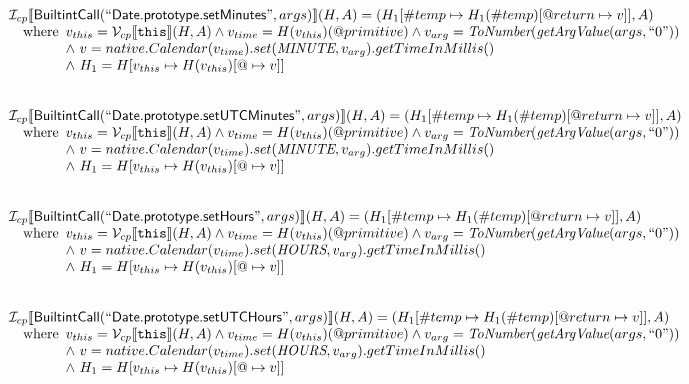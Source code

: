 \[\begin{array}{l}
\mathcal{I} _{cp}\llbracket \mbox{\textsf{BuiltintCall}}(``\mbox{\textsf{Date.prototype.setMinutes}}",args)\rrbracket(H,A)
  = (H_1[\#temp \mapsto H_1(\#temp)[@return \mapsto v]], A)\\
\quad{\rm where}\begin{array}[t]{l}
  v_{this} = \mathcal{V} _{cp}\llbracket \mbox{\texttt{this}}\rrbracket (H,A) \land v_{time} = H(v_{this})(@primitive)
  \land v_{arg} = \emph{ToNumber}(\emph{getArgValue}(args, ``0"))\\
  \land\ v = native.Calendar(v_{time}).set(\emph{MINUTE}, v_{arg}).getTimeInMillis()\\
  \land\ H_1 = H[v_{this} \mapsto H(v_{this})[@\mapsto v]]
  \end{array}\\
\\\\


\mathcal{I} _{cp}\llbracket \mbox{\textsf{BuiltintCall}}(``\mbox{\textsf{Date.prototype.setUTCMinutes}}",args)\rrbracket(H,A)
  = (H_1[\#temp \mapsto H_1(\#temp)[@return \mapsto v]], A)\\
\quad{\rm where}\begin{array}[t]{l}
  v_{this} = \mathcal{V} _{cp}\llbracket \mbox{\texttt{this}}\rrbracket (H,A) \land v_{time} = H(v_{this})(@primitive)
  \land v_{arg} = \emph{ToNumber}(\emph{getArgValue}(args, ``0"))\\
  \land\ v = native.Calendar(v_{time}).set(\emph{MINUTE}, v_{arg}).getTimeInMillis()\\
  \land\ H_1 = H[v_{this} \mapsto H(v_{this})[@\mapsto v]]
  \end{array}\\
\\\\


\mathcal{I} _{cp}\llbracket \mbox{\textsf{BuiltintCall}}(``\mbox{\textsf{Date.prototype.setHours}}",args)\rrbracket(H,A)
  = (H_1[\#temp \mapsto H_1(\#temp)[@return \mapsto v]], A)\\
\quad{\rm where}\begin{array}[t]{l}
  v_{this} = \mathcal{V} _{cp}\llbracket \mbox{\texttt{this}}\rrbracket (H,A) \land v_{time} = H(v_{this})(@primitive)
  \land v_{arg} = \emph{ToNumber}(\emph{getArgValue}(args, ``0"))\\
  \land\ v = native.Calendar(v_{time}).set(\emph{HOURS}, v_{arg}).getTimeInMillis()\\
  \land\ H_1 = H[v_{this} \mapsto H(v_{this})[@\mapsto v]]
  \end{array}\\
\\\\


\mathcal{I} _{cp}\llbracket \mbox{\textsf{BuiltintCall}}(``\mbox{\textsf{Date.prototype.setUTCHours}}",args)\rrbracket(H,A)
  = (H_1[\#temp \mapsto H_1(\#temp)[@return \mapsto v]], A)\\
\quad{\rm where}\begin{array}[t]{l}
  v_{this} = \mathcal{V} _{cp}\llbracket \mbox{\texttt{this}}\rrbracket (H,A) \land v_{time} = H(v_{this})(@primitive)
  \land v_{arg} = \emph{ToNumber}(\emph{getArgValue}(args, ``0"))\\
  \land\ v = native.Calendar(v_{time}).set(\emph{HOURS}, v_{arg}).getTimeInMillis()\\
  \land\ H_1 = H[v_{this} \mapsto H(v_{this})[@\mapsto v]]
  \end{array}\\
\\\\



\end{array}
\]


